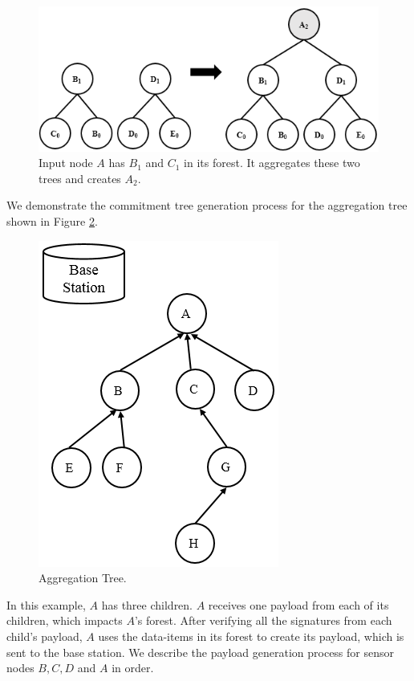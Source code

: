 	\begin{figure}[h!]
		\includegraphics{images/increase-height.png}
		\caption{Input node $A$ has $B_{1}$ and $C_{1}$ in its forest. It aggregates these two trees and creates $A_{2}$.}
		\label{fig:increase-height}
	\end{figure}
	
	We demonstrate the commitment tree generation process for the aggregation tree shown in Figure \ref{fig:Aggregation-tree-1}.
	\begin{figure}[h!]
		\centering
		\includegraphics{images/aggregation-tree-1.png}
		\caption{Aggregation Tree.}
		\label{fig:Aggregation-tree-1}
	\end{figure}
	In this example, $A$ has three children.
	$A$ receives one payload from each of its children, which impacts $A$'s forest.
	After verifying all the signatures from each child's payload, $A$ uses the data-items in its forest to create its payload, which is sent to the base station.
	We describe the payload generation process for sensor nodes $B,C,D$ and $A$ in order.

